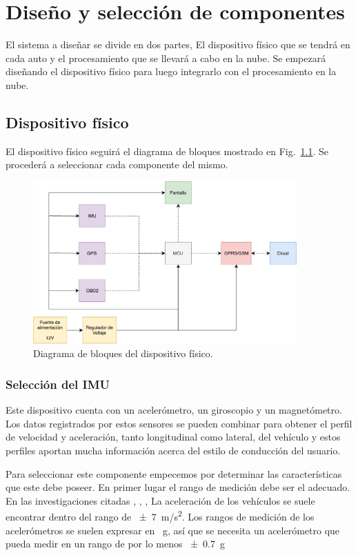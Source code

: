  \chapter{Diseño y selección de componentes}

 \graphicspath{{Chapter4/Figuras/}{Chapter4/Figs/PDF/}{Chapter4/Figs/}}

El sistema a diseñar se divide en dos partes, El dispositivo físico que se tendrá en cada auto y el procesamiento que se llevará a cabo en la nube. Se empezará diseñando el dispositivo físico para luego integrarlo con el procesamiento en la nube.

\section{Dispositivo físico}
El dispositivo físico seguirá el diagrama de bloques mostrado en Fig.~\ref{fig:bloques}. Se procederá a seleccionar cada componente del mismo.

\begin{figure}[htbp!]
\centering
\includegraphics[width=0.9\textwidth]{Bloques.pdf}
\caption{Diagrama de bloques del dispositivo físico.}
\label{fig:bloques}
\end{figure}

\subsection{Selección del IMU}
Este dispositivo cuenta con un acelerómetro, un giroscopio y un magnetómetro. Los datos registrados por estos sensores se pueden combinar para obtener el perfil de velocidad y aceleración, tanto longitudinal como lateral, del vehículo y estos perfiles aportan mucha información acerca del estilo de conducción del usuario.

Para seleccionar este componente empecemos por determinar las características que este debe poseer. En primer lugar el rango de medición debe ser el adecuado. En las investigaciones citadas  \cite{6957822}, \cite{constantinescu}, \cite{6083078},  \cite{Va-2013} La aceleración de los vehículos se suele encontrar dentro del rango de \SI{\pm7}{m/s^2}. Los rangos de medición de los acelerómetros se suelen expresar en \SI{}{g}, así que se necesita un acelerómetro que pueda medir en un rango de por lo menos \SI{\pm0.7}{g}

